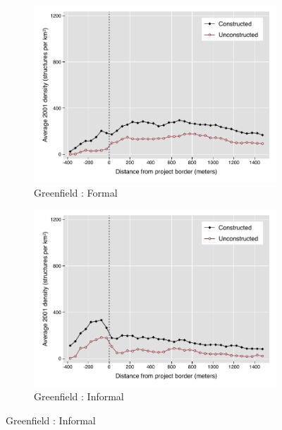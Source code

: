 \documentclass[12pt]{article}
\begin{document}
\begin{figure}
        \begin{subfigure}[b]{0.495\textwidth}
            \centering
        \caption{Greenfield : Formal}
            \includegraphics[width=\textwidth,trim={0.3cm .3cm 0.1cm 0cm}, clip=true]{figures/bblu_for_pre_means_4_1}
        \end{subfigure}
        \hfill
        \begin{subfigure}[b]{0.495\textwidth}  
            \centering 
        \caption{Greenfield : Informal}
            \includegraphics[width=\textwidth,trim={0.3cm .3cm 0.1cm 0cm}, clip=true]{figures/bblu_inf_pre_means_4_1.pdf}
        \end{subfigure}

\end{figure}
\end{document}
